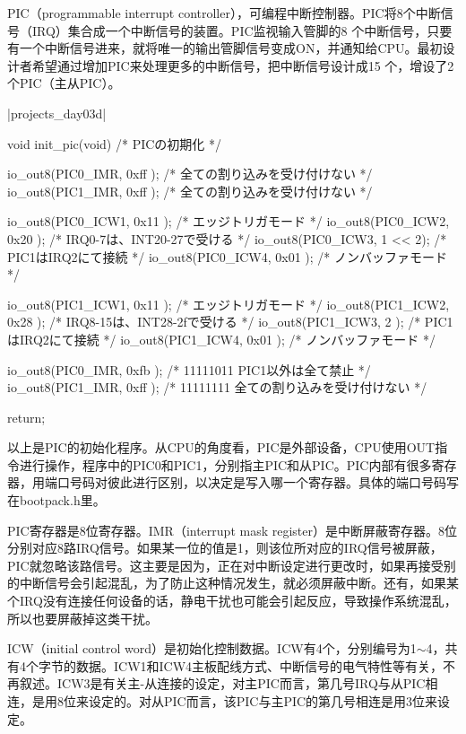 PIC（programmable interrupt controller），可编程中断控制器。PIC将8个中断信号（IRQ）集合成一个中断信号的装置。PIC监视输入管脚的8 个中断信号，只要有一个中断信号进来，就将唯一的输出管脚信号变成ON，并通知给CPU。最初设计者希望通过增加PIC来处理更多的中断信号，把中断信号设计成15 个，增设了2个PIC（主从PIC）。

\cs

\dag|projects_day\harib03d|
\begin{code}[label=int.c的主要组成部分]
void init_pic(void)
/* PICの初期化 */
{
	io_out8(PIC0_IMR,  0xff  ); /* 全ての割り込みを受け付けない */
	io_out8(PIC1_IMR,  0xff  ); /* 全ての割り込みを受け付けない */

	io_out8(PIC0_ICW1, 0x11  ); /* エッジトリガモード */
	io_out8(PIC0_ICW2, 0x20  ); /* IRQ0-7は、INT20-27で受ける */
	io_out8(PIC0_ICW3, 1 << 2); /* PIC1はIRQ2にて接続 */
	io_out8(PIC0_ICW4, 0x01  ); /* ノンバッファモード */

	io_out8(PIC1_ICW1, 0x11  ); /* エッジトリガモード */
	io_out8(PIC1_ICW2, 0x28  ); /* IRQ8-15は、INT28-2fで受ける */
	io_out8(PIC1_ICW3, 2     ); /* PIC1はIRQ2にて接続 */
	io_out8(PIC1_ICW4, 0x01  ); /* ノンバッファモード */

	io_out8(PIC0_IMR,  0xfb  ); /* 11111011 PIC1以外は全て禁止 */
	io_out8(PIC1_IMR,  0xff  ); /* 11111111 全ての割り込みを受け付けない */

	return;
}
\end{code}

以上是PIC的初始化程序。从CPU的角度看，PIC是外部设备，CPU使用OUT指令进行操作，程序中的PIC0和PIC1，分别指主PIC和从PIC。PIC内部有很多寄存器，用端口号码对彼此进行区别，以决定是写入哪一个寄存器。具体的端口号码写在bootpack.h里。

\cs

PIC寄存器是8位寄存器。IMR（interrupt mask register）是中断屏蔽寄存器。8位分别对应8路IRQ信号。如果某一位的值是1，则该位所对应的IRQ信号被屏蔽，PIC就忽略该路信号。这主要是因为，正在对中断设定进行更改时，如果再接受别的中断信号会引起混乱，为了防止这种情况发生，就必须屏蔽中断。还有，如果某个IRQ没有连接任何设备的话，静电干扰也可能会引起反应，导致操作系统混乱，所以也要屏蔽掉这类干扰。

ICW（initial control word）是初始化控制数据。ICW有4个，分别编号为1$\sim$4，共有4个字节的数据。ICW1和ICW4主板配线方式、中断信号的电气特性等有关，不再叙述。ICW3是有关主-从连接的设定，对主PIC而言，第几号IRQ与从PIC相连，是用8位来设定的。对从PIC而言，该PIC与主PIC的第几号相连是用3位来设定。

\cs


